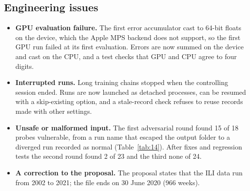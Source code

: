 \documentclass[11pt,letterpaper]{article}
\begin{document}
\subsection{Engineering issues}
\begin{itemize}
\item \textbf{GPU evaluation failure.} The first error accumulator cast to 64-bit floats on the device, which the Apple MPS backend does not support, so the first GPU run failed at its first evaluation. Errors are now summed on the device and cast on the CPU, and a test checks that GPU and CPU agree to four digits.
\item \textbf{Interrupted runs.} Long training chains stopped when the controlling session ended. Runs are now launched as detached processes, can be resumed with a skip-existing option, and a stale-record check refuses to reuse records made with other settings.
\item \textbf{Unsafe or malformed input.} The first adversarial round found 15 of 18 probes vulnerable, from a run name that escaped the output folder to a diverged run recorded as normal (Table~\ref{tab:14}). After fixes and regression tests the second round found 2 of 23 and the third none of 24.
\item \textbf{A correction to the proposal.} The proposal states that the ILI data run from 2002 to 2021; the file ends on 30 June 2020 (966 weeks).
\end{itemize}
\end{document}
